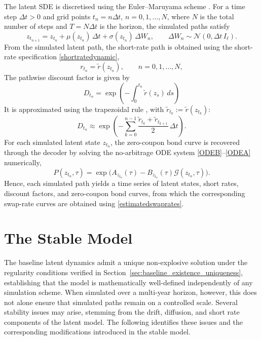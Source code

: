 
The latent SDE is discretised using the Euler--Maruyama scheme \citep{Glasserman2004}. For a time step \(\Delta t>0\) and grid points \(t_n=n\Delta t\), \(n=0,1,\ldots,N\), where $N$ is the total number of steps and \(T=N\Delta t\) is the horizon, the simulated paths satisfy
\[
z_{t_{n+1}}
=
z_{t_n}
+
\mu(z_{t_n})\,\Delta t
+
\sigma(z_{t_n})\,\Delta W_n,
\qquad
\Delta W_n \sim \mathcal{N}(0,\Delta t\,I_{\ell}).
\]
From the simulated latent path, the short-rate path is obtained using the short-rate specification \eqref{shortratedynamic},
\[
r_{t_n}=\tilde r(z_{t_n}),
\qquad n=0,1,\ldots,N,
\]
The pathwise discount factor is given by
\[
D_{t_n}
=
\exp\left(
-
\int_{0}^{t_n}
\tilde{r}(z_{s})\,ds 
\right)
\]
It is approximated using the trapezoidal rule \citep{Glasserman2004}, with \(\tilde{r}_{t_k}:=\tilde{r}(z_{t_k})\):
\[
D_{t_n}
\approx
\exp\!\left(
-
\sum_{k=0}^{n-1}
\frac{\tilde{r}_{t_k}+\tilde{r}_{t_{k+1}}}{2}\,\Delta t
\right).
\]
For each simulated latent state \(z_{t_n}\), the zero-coupon bond curve is recovered through the decoder by solving the no-arbitrage ODE system \eqref{ODEB}--\eqref{ODEA} numerically,
\[
P(z_{t_n},\tau)
=
\exp\bigl(
A_{z_{t_n}}(\tau)
-
B_{z_{t_n}}(\tau)\mathcal{G}(z_{t_n},\tau)
\bigr).
\]
Hence, each simulated path yields a time series of latent states, short rates, discount factors, and zero-coupon bond curves, from which the corresponding swap-rate curves are obtained using \eqref{estimatedswaprates}.

\section{The Stable Model}
\label{sec:stability_analysis}

The baseline latent dynamics admit a unique non-explosive solution under the regularity conditions verified in Section~\ref{sec:baseline_existence_uniqueness}, establishing that the model is mathematically well-defined independently of any simulation scheme. When simulated over a multi-year horizon, however, this does not alone ensure that simulated paths remain on a controlled scale. Several stability issues may arise, stemming from the drift, diffusion, and short rate components of the latent model. The following identifies these issues and the corresponding modifications introduced in the stable model.

